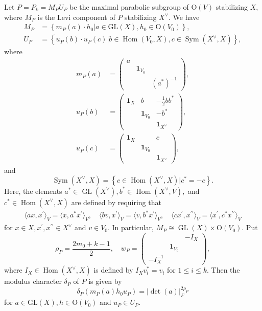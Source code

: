 \documentclass[article]{article}
\numberwithin{equation}{section}
\theoremstyle{definition}
\DeclareMathOperator{\GL}{GL}
\begin{document}
Let $P=P_{k}=M_P U_{P}$ be the maximal parabolic subgroup of $\mathrm O(V)$ stabilizing $X$, where $M_{P}$ is the Levi component of $P$ stabilizing $X^{\vee}$. We have 
$$\begin{aligned} M_{P} &=\left\{m_{P}(a) \cdot h_0 | a \in \mathrm{GL}(X), h_0 \in \mathrm{O}(V_0)\right\} ,\\ U_{P} &=\left\{u_{P}(b) \cdot u_{P}(c) | b \in \operatorname{Hom}(V_0, X), c \in \operatorname{Sym}\left(X^{\vee}, X\right)\right\}, \end{aligned}$$ 
where 
\begin{align*}
m_{P}(a)&=\left(\begin{array}{ccc}{a} & {}& \\ {} & {\mathbf 1_{V_0}} & {} \\ {} & {} & {\left(a^{*}\right)^{-1}}\end{array}\right),\\
u_{P}(b)&=\left(\begin{array}{ccc}{\mathbf 1_{X}} & {b} & {-\frac{1}{2} b b^{*}} \\ {} & {\mathbf 1_{V_0}} & {-b^{*}} \\ {} & {} & {\mathbf 1_{X^{\vee}}}\end{array}\right),\\
u_{P}(c)&=\left(\begin{array}{ccc}{\mathbf 1_{X}} & {} & {c} \\ {} & {\mathbf 1_{V_0}} & {} \\ {} & {} & {\mathbf 1_{X^{\vee}}}\end{array}\right),
\end{align*}
and 
$$\operatorname{Sym}\left(X^{\vee}, X\right)=\left\{c \in \operatorname{Hom}\left(X^{\vee}, X\right) | c^{*}=-c\right\}.$$
Here, the elements $a^{*} \in \GL\left(X^{\vee}\right), b^{*} \in \operatorname{Hom}\left(X^{\vee}, V\right),$ and $c^{*} \in \operatorname{Hom}\left(X^{\vee}, X\right)$ are defined by requiring that 
\begin{align*}
\langle a x, x^{\prime}\rangle_{V}=\langle x, a^{*} x^{\prime}\rangle_{V},\quad \langle b v, x^{\prime}\rangle_{V}=\langle v, b^{*} x^{\prime}\rangle_{V},\quad
\langle c x^{\prime}, x^{\prime \prime}\rangle_{V}=\langle x^{\prime}, c^{*} x^{\prime \prime}\rangle_{V}
\end{align*}
for $x \in X, x^{\prime}, x^{\prime \prime} \in X^{\vee}$ and $v \in V_0$. In particular, $M_P\cong \GL(X)\times \mathrm O(V_0)$.  
Put 
$$\rho_{P}=\frac{2m_0+k-1}{2}, \quad w_{P}=\left(\begin{array}{ccc}
{} &{}& -I_{X} \\ 
{} &{\mathbf 1_{V_0}} & {}\\
{-I_{X}^{-1}}&{}& 
\end{array}\right),$$
where $I_{X} \in \operatorname{Hom}\left(X^{\vee}, X\right)$ is defined by $I_{X} v_{i}^{*}=v_{i}$ for $1 \leq i \leq k .$ Then the modulus character $\delta_{P}$ of $P$ is given by
$$\delta_{P}\left(m_{P}(a) h_0 u_{P}\right)=|\operatorname{det}(a)|_{F}^{2 \rho_{P}}$$
for $a \in \mathrm{GL}(X), h \in \mathrm{O}(V_0)$ and $u_{P} \in U_{P}$. 
\end{document}
